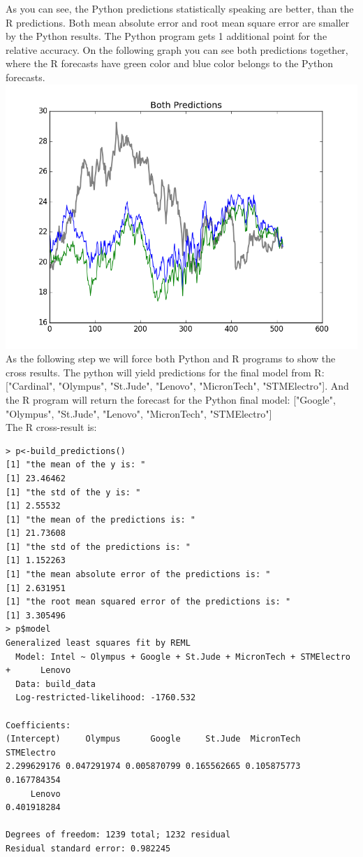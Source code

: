 \documentclass{article}
\begin{document}
As you can see, the Python predictions statistically speaking are better, than the R predictions. Both mean absolute error and root mean square error are smaller by the Python results. The Python program gets 1 additional point for the relative accuracy. On the following graph you can see both predictions together, where the R forecasts have green color and blue color belongs to the Python forecasts.\\
\includegraphics[scale=0.75]{BothPredictions.png}\\
As the following step we will force both Python and R programs to show the cross results. The python will yield predictions for the final model from R: ["Cardinal", "Olympus", "St.Jude", "Lenovo", "MicronTech", "STMElectro"]. And the R program will return the forecast for the Python final model: ["Google", "Olympus", "St.Jude", "Lenovo", "MicronTech", "STMElectro"]\\
The R cross-result is:
\begin{verbatim}
> p<-build_predictions()
[1] "the mean of the y is: "
[1] 23.46462
[1] "the std of the y is: "
[1] 2.55532
[1] "the mean of the predictions is: "
[1] 21.73608
[1] "the std of the predictions is: "
[1] 1.152263
[1] "the mean absolute error of the predictions is: "
[1] 2.631951
[1] "the root mean squared error of the predictions is: "
[1] 3.305496
> p$model
Generalized least squares fit by REML
  Model: Intel ~ Olympus + Google + St.Jude + MicronTech + STMElectro +      Lenovo 
  Data: build_data 
  Log-restricted-likelihood: -1760.532

Coefficients:
(Intercept)     Olympus      Google     St.Jude  MicronTech  STMElectro 
2.299629176 0.047291974 0.005870799 0.165562665 0.105875773 0.167784354 
     Lenovo 
0.401918284 

Degrees of freedom: 1239 total; 1232 residual
Residual standard error: 0.982245 
\end{verbatim}
\end{document}
